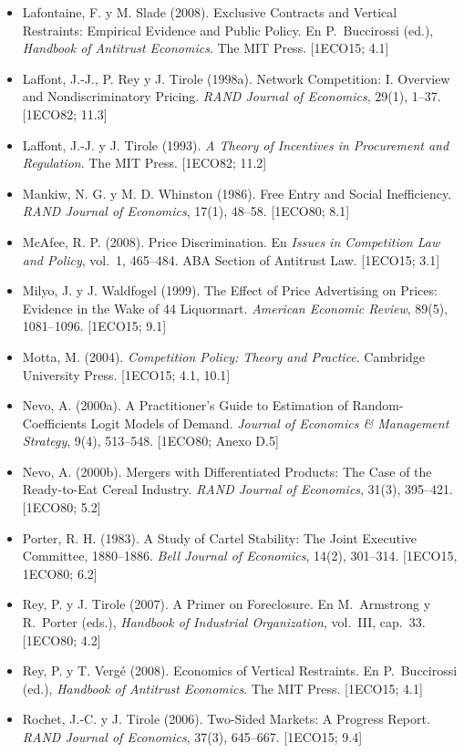 \documentclass[11pt,a4paper]{article}
\begin{document}
{\begin{itemize}[leftmargin=1.4em,itemsep=1pt,label={}]
\item Lafontaine, F. y M. Slade (2008). Exclusive Contracts and Vertical Restraints: Empirical Evidence and Public Policy. En P.~Buccirossi (ed.), \emph{Handbook of Antitrust Economics}. The MIT Press. [1ECO15; 4.1]
\item Laffont, J.-J., P. Rey y J. Tirole (1998a). Network Competition: I. Overview and Nondiscriminatory Pricing. \emph{RAND Journal of Economics}, 29(1), 1--37. [1ECO82; 11.3]
\item Laffont, J.-J. y J. Tirole (1993). \emph{A Theory of Incentives in Procurement and Regulation}. The MIT Press. [1ECO82; 11.2]
\item Mankiw, N. G. y M. D. Whinston (1986). Free Entry and Social Inefficiency. \emph{RAND Journal of Economics}, 17(1), 48--58. [1ECO80; 8.1]
\item McAfee, R. P. (2008). Price Discrimination. En \emph{Issues in Competition Law and Policy}, vol.~1, 465--484. ABA Section of Antitrust Law. [1ECO15; 3.1]
\item Milyo, J. y J. Waldfogel (1999). The Effect of Price Advertising on Prices: Evidence in the Wake of 44 Liquormart. \emph{American Economic Review}, 89(5), 1081--1096. [1ECO15; 9.1]
\item Motta, M. (2004). \emph{Competition Policy: Theory and Practice}. Cambridge University Press. [1ECO15; 4.1, 10.1]
\item Nevo, A. (2000a). A Practitioner's Guide to Estimation of Random-Coefficients Logit Models of Demand. \emph{Journal of Economics \& Management Strategy}, 9(4), 513--548. [1ECO80; Anexo D.5]
\item Nevo, A. (2000b). Mergers with Differentiated Products: The Case of the Ready-to-Eat Cereal Industry. \emph{RAND Journal of Economics}, 31(3), 395--421. [1ECO80; 5.2]
\item Porter, R. H. (1983). A Study of Cartel Stability: The Joint Executive Committee, 1880--1886. \emph{Bell Journal of Economics}, 14(2), 301--314. [1ECO15, 1ECO80; 6.2]
\item Rey, P. y J. Tirole (2007). A Primer on Foreclosure. En M.~Armstrong y R.~Porter (eds.), \emph{Handbook of Industrial Organization}, vol.~III, cap.~33. [1ECO80; 4.2]
\item Rey, P. y T. Vergé (2008). Economics of Vertical Restraints. En P.~Buccirossi (ed.), \emph{Handbook of Antitrust Economics}. The MIT Press. [1ECO15; 4.1]
\item Rochet, J.-C. y J. Tirole (2006). Two-Sided Markets: A Progress Report. \emph{RAND Journal of Economics}, 37(3), 645--667. [1ECO15; 9.4]

\end{itemize}}
\end{document}
